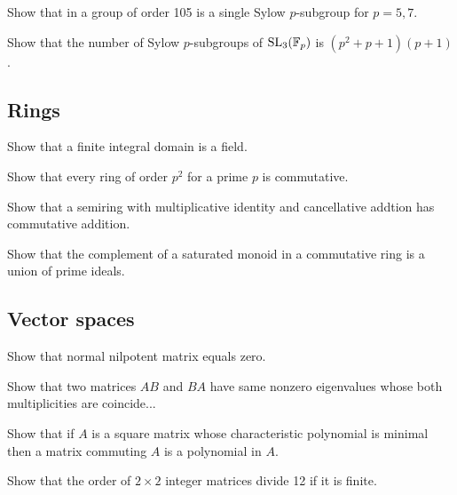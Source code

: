 \documentclass[12pt]{article}
\begin{document}
	\begin{prb}
	Show that in a group of order 105 is a single Sylow $p$-subgroup for $p=5,7$.
	\end{prb}

	\begin{prb}
	Show that the number of Sylow $p$-subgroups of $\mathrm{SL}_3(\mathbb{F}_p)$ is $(p^2+p+1)(p+1)$.
	\end{prb}

	\subsection{Rings}
	\begin{prb}
	Show that a finite integral domain is a field.
	\end{prb}

	\begin{prb}
	Show that every ring of order $p^2$ for a prime $p$ is commutative.
	\end{prb}

	\begin{prb}
	Show that a semiring with multiplicative identity and cancellative addtion has commutative addition.
	\end{prb}

	\begin{prb}
	Show that the complement of a saturated monoid in a commutative ring is a union of prime ideals.
	\end{prb}

	\subsection{Vector spaces}
	\begin{prb}
	Show that normal nilpotent matrix equals zero.
	\end{prb}

	\begin{prb}
	Show that two matrices $AB$ and $BA$ have same nonzero eigenvalues whose both multiplicities are coincide...
	\end{prb}

	\begin{prb}
	Show that if $A$ is a square matrix whose characteristic polynomial is minimal then a matrix commuting $A$ is a polynomial in $A$.
	\end{prb}

	\begin{prb}
	Show that the order of $2\times 2$ integer matrices divide 12 if it is finite.
	\end{prb}
\end{document}
